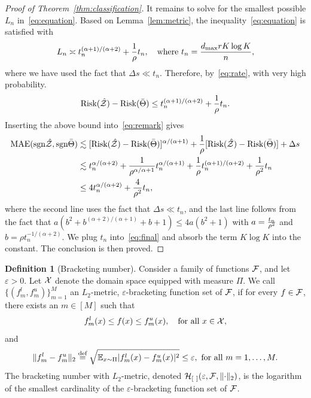 \documentclass[11pt]{article}
\theoremstyle{plain}
\theoremstyle{definition}
\newtheorem{defn}{Definition}
\def\sign{\textup{sgn}}
\def\risk{\textup{Risk}}
\begin{document}
\begin{proof}[Proof of Theorem~\ref{thm:classification}]
It remains to solve for the smallest possible $L_n$ in~\eqref{eq:equation}. Based on Lemma~\ref{lem:metric}, the inequality~\eqref{eq:equation} is satisfied with 
\begin{equation}\label{eq:tn}
L_n\asymp t_n^{(\alpha+1)/ (\alpha+2)} +{1\over \rho} t_n, \quad \text{where }t_n={d_{\max}rK\log K \over n},
\end{equation}
where we have used the fact that $\Delta s\ll t_n$. 
Therefore, by~\eqref{eq:rate}, with very high probability. 
\[
\risk(\hat \tZ)-\risk(\bar \Theta )\leq t_n^{(\alpha+1)/(\alpha+2)} +{1\over \rho} t_n.
\]
Inserting the above bound into~\eqref{eq:remark} gives
\begin{align}\label{eq:final}
\textup{MAE}(\sign \hat \tZ, \sign \bar \Theta) &\lesssim [\risk(\hat \tZ)-\risk(\bar \Theta)]^{\alpha/(\alpha+1)}+{1\over \rho}[\risk(\hat \tZ)-\risk(\bar \Theta)]+\Delta s\notag \\
&\lesssim t_n^{\alpha/(\alpha+2)}+{1\over \rho^{\alpha/\alpha+1}}t_n^{\alpha/(\alpha+1)}+{1\over \rho}t_n^{(\alpha+1)/(\alpha+2)}+{1\over \rho^2}t_n\notag \\
&\leq 4t_n^{\alpha/(\alpha+2)}+{4\over \rho^2}t_n,
\end{align}
where the second line uses the fact that $\Delta s \ll t_n$, and the last line follows from the fact that $a(b^2+b^{(\alpha+2)/(\alpha+1)}+b+1) \leq 4 a (b^2+1)$ with $a={t_n \over \rho^2}$ and $b=\rho t_n^{-1/(\alpha+2)}$. We plug $t_n$ into~\eqref{eq:final} and absorb the term $K\log K$ into the constant. The conclusion is then proved. 
\end{proof}

\begin{defn}[Bracketing number]\label{pro:inftynorm}
Consider a family of functions $\mathcal{F}$, and let $\varepsilon>0$. Let $\mathcal{X} $ denote the domain space equipped with measure $\Pi$. We call $\{(f^l_m,f^u_m)\}_{m=1}^M$ an $L_2$-metric, $\varepsilon$-bracketing function set of $\mathcal{F}$, if for every $f\in \mathcal{F}$, there exists an $m\in[M]$ such that 
\[
f^l_m(x)\leq f(x)\leq f^u_m(x),\quad \text{for all }x\in\mathcal{X},
\]
and
\[
\lVert f^l_m-f^u_m\rVert_2\stackrel{\text{def}}{=}\sqrt{\mathbb{E}_{x\sim \Pi}|f^l_m(x)-f^u_m(x)|^2} \leq \varepsilon, \ \text{for all } m=1,\ldots,M. 
\]
The bracketing number with $L_2$-metric, denoted $\mathcal{H}_{[\ ]}(\varepsilon, \mathcal{F}, \lVert\cdot\rVert_2)$, is the logarithm of the smallest cardinality of the $\varepsilon$-bracketing function set of $\mathcal{F}$.  \\
\end{defn}
\end{document}
